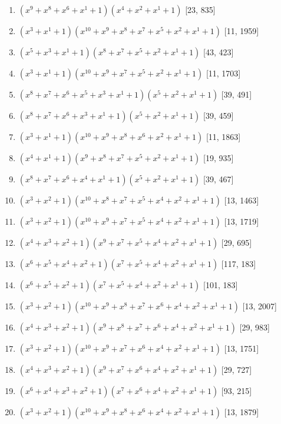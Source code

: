 \documentclass[10pt,twocolumn]{article}
\begin{document}
\begin{enumerate}
\item $(x^{9} + x^{8} + x^{6} + x^{1} + 1)(x^{4} + x^{2} + x^{1} + 1)$  [23, 835]
\item $(x^{3} + x^{1} + 1)(x^{10} + x^{9} + x^{8} + x^{7} + x^{5} + x^{2} + x^{1} + 1)$  [11, 1959]
\item $(x^{5} + x^{3} + x^{1} + 1)(x^{8} + x^{7} + x^{5} + x^{2} + x^{1} + 1)$  [43, 423]
\item $(x^{3} + x^{1} + 1)(x^{10} + x^{9} + x^{7} + x^{5} + x^{2} + x^{1} + 1)$  [11, 1703]
\item $(x^{8} + x^{7} + x^{6} + x^{5} + x^{3} + x^{1} + 1)(x^{5} + x^{2} + x^{1} + 1)$  [39, 491]
\item $(x^{8} + x^{7} + x^{6} + x^{3} + x^{1} + 1)(x^{5} + x^{2} + x^{1} + 1)$  [39, 459]
\item $(x^{3} + x^{1} + 1)(x^{10} + x^{9} + x^{8} + x^{6} + x^{2} + x^{1} + 1)$  [11, 1863]
\item $(x^{4} + x^{1} + 1)(x^{9} + x^{8} + x^{7} + x^{5} + x^{2} + x^{1} + 1)$  [19, 935]
\item $(x^{8} + x^{7} + x^{6} + x^{4} + x^{1} + 1)(x^{5} + x^{2} + x^{1} + 1)$  [39, 467]
\item $(x^{3} + x^{2} + 1)(x^{10} + x^{8} + x^{7} + x^{5} + x^{4} + x^{2} + x^{1} + 1)$  [13, 1463]
\item $(x^{3} + x^{2} + 1)(x^{10} + x^{9} + x^{7} + x^{5} + x^{4} + x^{2} + x^{1} + 1)$  [13, 1719]
\item $(x^{4} + x^{3} + x^{2} + 1)(x^{9} + x^{7} + x^{5} + x^{4} + x^{2} + x^{1} + 1)$  [29, 695]
\item $(x^{6} + x^{5} + x^{4} + x^{2} + 1)(x^{7} + x^{5} + x^{4} + x^{2} + x^{1} + 1)$  [117, 183]
\item $(x^{6} + x^{5} + x^{2} + 1)(x^{7} + x^{5} + x^{4} + x^{2} + x^{1} + 1)$  [101, 183]
\item $(x^{3} + x^{2} + 1)(x^{10} + x^{9} + x^{8} + x^{7} + x^{6} + x^{4} + x^{2} + x^{1} + 1)$  [13, 2007]
\item $(x^{4} + x^{3} + x^{2} + 1)(x^{9} + x^{8} + x^{7} + x^{6} + x^{4} + x^{2} + x^{1} + 1)$  [29, 983]
\item $(x^{3} + x^{2} + 1)(x^{10} + x^{9} + x^{7} + x^{6} + x^{4} + x^{2} + x^{1} + 1)$  [13, 1751]
\item $(x^{4} + x^{3} + x^{2} + 1)(x^{9} + x^{7} + x^{6} + x^{4} + x^{2} + x^{1} + 1)$  [29, 727]
\item $(x^{6} + x^{4} + x^{3} + x^{2} + 1)(x^{7} + x^{6} + x^{4} + x^{2} + x^{1} + 1)$  [93, 215]
\item $(x^{3} + x^{2} + 1)(x^{10} + x^{9} + x^{8} + x^{6} + x^{4} + x^{2} + x^{1} + 1)$  [13, 1879]

\end{enumerate}
\end{document}
